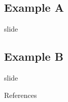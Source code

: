 \documentclass[xcolor=dvipsnames]{beamer}
\begin{document}
  \subsection{Example A}

  \begin{frame}{slide}
  \end{frame}

  \subsection{Example B}

  \begin{frame}{slide}
    \citep{tf}
  \end{frame}

  \begin{frame}{References}
    
  \end{frame}
\end{document}
